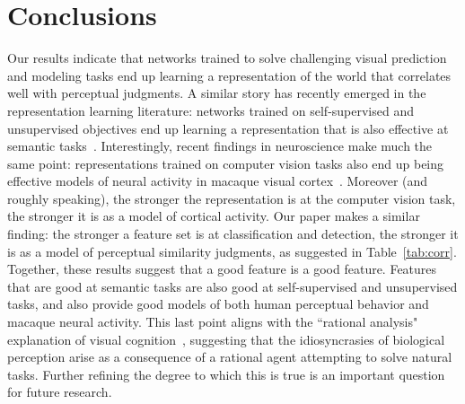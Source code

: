 \section{Conclusions}
\vspace{-1mm}

Our results indicate that networks trained to solve challenging visual prediction and modeling tasks end up learning a representation of the world that correlates well with perceptual judgments. A similar story has recently emerged in the representation learning literature: networks trained on self-supervised and unsupervised objectives end up learning a representation that is also effective at semantic tasks~\cite{doersch2015unsupervised}. Interestingly, recent findings in neuroscience make much the same point: representations trained on computer vision tasks also end up being effective models of neural activity in macaque visual cortex~\cite{yamins2016using}. Moreover (and roughly speaking), the stronger the representation is at the computer vision task, the stronger it is as a model of cortical activity. Our paper makes a similar finding: the stronger a feature set is at classification and detection, the stronger it is as a model of perceptual similarity judgments, as suggested in Table~\ref{tab:corr}. Together, these results suggest that a good feature is a good feature. Features that are good at semantic tasks are also good at self-supervised and unsupervised tasks, and also provide good models of both human perceptual behavior and macaque neural activity. This last point aligns with the ``rational analysis" explanation of visual cognition~\cite{anderson1990adaptive}, suggesting that the idiosyncrasies of biological perception arise as a consequence of a rational agent attempting to solve natural tasks. Further refining the degree to which this is true is an important question for future research.
